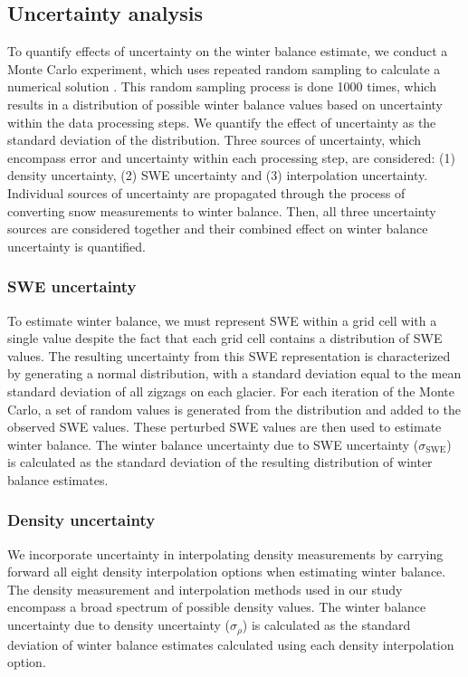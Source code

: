\documentclass[review,oneside, letterpaper]{igs}
\begin{document}
\subsection{Uncertainty analysis}

To quantify effects of uncertainty on the winter balance estimate, we conduct a Monte Carlo experiment, which uses repeated random sampling to calculate a numerical solution \citep{Metropolis1949}. This random sampling process is done 1000 times, which results in a distribution of possible winter balance values based on uncertainty within the data processing steps. We quantify the effect of uncertainty as the standard deviation of the distribution. Three sources of uncertainty, which encompass error and uncertainty within each processing step, are considered: (1) density uncertainty, (2) SWE uncertainty and (3) interpolation uncertainty. Individual sources of uncertainty are propagated through the process of converting snow measurements to winter balance. Then, all three uncertainty sources are considered together and their combined effect on winter balance uncertainty is quantified.

\subsubsection{SWE uncertainty}
To estimate winter balance, we must represent SWE within a grid cell with a single value despite the fact that each grid cell contains a distribution of SWE values. The resulting uncertainty from this SWE representation is characterized by generating a normal distribution, with a standard deviation equal to the mean standard deviation of all zigzags on each glacier. For each iteration of the Monte Carlo, a set of random values is generated from the distribution and added to the observed SWE values. These perturbed SWE values are then used to estimate winter balance. The winter balance uncertainty due to SWE uncertainty ($\sigma_{\mathrm{SWE}}$) is calculated as the standard deviation of the resulting distribution of winter balance estimates.  

\subsubsection{Density uncertainty}
We incorporate uncertainty in interpolating density measurements by carrying forward all eight density interpolation options when estimating winter balance. The density measurement and interpolation methods used in our study encompass a broad spectrum of possible density values. The winter balance uncertainty due to density uncertainty ($\sigma_{\rho}$) is calculated as the standard deviation of winter balance estimates calculated using each density interpolation option.
\end{document}
